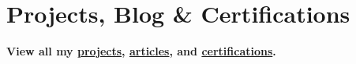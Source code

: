 \documentclass[a4paper,20pt]{article}
\begin{document}
            
\vspace{-9pt}
\section{Projects, Blog \& Certifications}
\textbf{View all my \href{https://dac.ac/projects}{projects}, \href{https://dac.ac}{articles}, and \href{https://www.linkedin.com/in/dreth/details/certifications/}{certifications}.}
        
\end{document}
